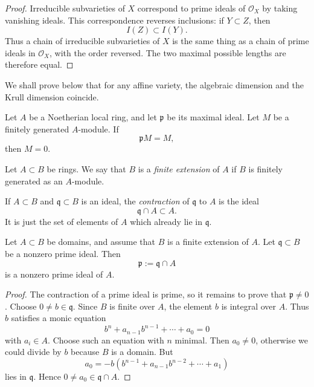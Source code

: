 \begin{proof}
Irreducible subvarieties of $X$
correspond to prime ideals of
$\mathcal{O}_X$ by taking vanishing ideals.
This correspondence reverses inclusions:
if $Y\subset Z$, then
$$
I(Z)\subset I(Y).
$$
Thus a chain of irreducible subvarieties
of $X$ is the same thing as a chain of
prime ideals in $\mathcal{O}_X$, with the
order reversed.
The two maximal possible lengths are
therefore equal.
\end{proof}

\noindent
We shall prove below that for any affine
variety, the algebraic dimension and the
Krull dimension coincide.

\begin{lemma}
\label{lemma-nakayama-local-rings}
Let $A$ be a Noetherian local ring,
and let $\mathfrak{p}$ be its maximal ideal.
Let $M$ be a finitely generated $A$-module.
If
$$
\mathfrak{p}M=M,
$$
then $M=0$.
\end{lemma}

\begin{definition}
\label{definition-finite-ring-extension}
Let $A\subset B$ be rings.
We say that $B$ is a {\it finite extension}
of $A$ if $B$ is finitely generated
as an $A$-module.
\end{definition}

\noindent
If $A\subset B$ and $\mathfrak{q}\subset B$
is an ideal, the {\it contraction} of
$\mathfrak{q}$ to $A$ is the ideal
$$
\mathfrak{q}\cap A\subset A.
$$
It is just the set of elements of $A$
which already lie in $\mathfrak{q}$.

\begin{lemma}
\label{lemma-contraction-nonzero-prime}
Let $A\subset B$ be domains, and assume
that $B$ is a finite extension of $A$.
Let $\mathfrak{q}\subset B$ be a nonzero
prime ideal.
Then
$$
\mathfrak{p}:=\mathfrak{q}\cap A
$$
is a nonzero prime ideal of $A$.
\end{lemma}

\begin{proof}
The contraction of a prime ideal is prime,
so it remains to prove that
$\mathfrak{p}\neq 0$.
Choose $0\neq b\in \mathfrak{q}$.
Since $B$ is finite over $A$,
the element $b$ is integral over $A$.
Thus $b$ satisfies a monic equation
$$
b^n+a_{n-1}b^{n-1}+\cdots+a_0=0
$$
with $a_i\in A$.
Choose such an equation with $n$ minimal.
Then $a_0\neq 0$, otherwise we could divide
by $b$ because $B$ is a domain.
But
$$
a_0=-b(b^{n-1}+a_{n-1}b^{n-2}
+\cdots+a_1)
$$
lies in $\mathfrak{q}$.
Hence $0\neq a_0\in \mathfrak{q}\cap A$.
\end{proof}


